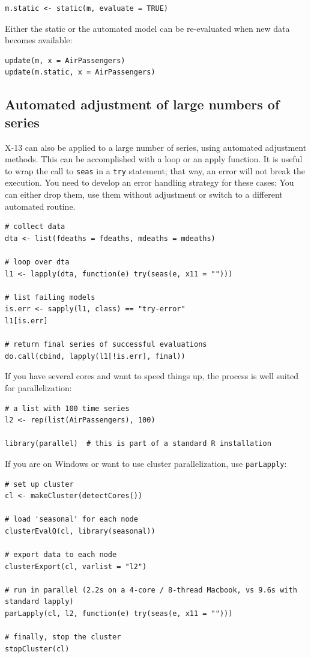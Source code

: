 \begin{verbatim}
m.static <- static(m, evaluate = TRUE) 
\end{verbatim}

Either the static or the automated model can be re-evaluated when new
data becomes available:

\begin{verbatim}
update(m, x = AirPassengers)
update(m.static, x = AirPassengers)
\end{verbatim}

\subsection{Automated adjustment of large numbers of
series}\label{automated-adjustment-of-large-numbers-of-series}

X-13 can also be applied to a large number of series, using automated
adjustment methods. This can be accomplished with a loop or an apply
function. It is useful to wrap the call to \texttt{seas} in a
\texttt{try} statement; that way, an error will not break the execution.
You need to develop an error handling strategy for these cases: You can
either drop them, use them without adjustment or switch to a different
automated routine.

\begin{verbatim}
# collect data 
dta <- list(fdeaths = fdeaths, mdeaths = mdeaths)

# loop over dta
l1 <- lapply(dta, function(e) try(seas(e, x11 = "")))

# list failing models
is.err <- sapply(l1, class) == "try-error"
l1[is.err]

# return final series of successful evaluations
do.call(cbind, lapply(l1[!is.err], final))
\end{verbatim}

If you have several cores and want to speed things up, the process is
well suited for parallelization:

\begin{verbatim}
# a list with 100 time series
l2 <- rep(list(AirPassengers), 100)

library(parallel)  # this is part of a standard R installation
\end{verbatim}

If you are on Windows or want to use cluster parallelization, use
\texttt{parLapply}:

\begin{verbatim}
# set up cluster
cl <- makeCluster(detectCores())

# load 'seasonal' for each node
clusterEvalQ(cl, library(seasonal))

# export data to each node
clusterExport(cl, varlist = "l2")

# run in parallel (2.2s on a 4-core / 8-thread Macbook, vs 9.6s with standard lapply)
parLapply(cl, l2, function(e) try(seas(e, x11 = "")))

# finally, stop the cluster
stopCluster(cl)
\end{verbatim}


